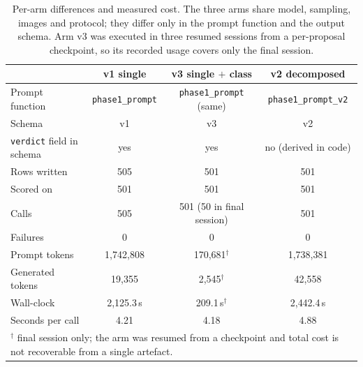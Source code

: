 \begin{table}[t]
\centering
\caption{Per-arm differences and measured cost. The three arms share model,
sampling, images and protocol; they differ only in the prompt function and the
output schema. Arm v3 was executed in three resumed sessions from a per-proposal
checkpoint, so its recorded usage covers only the final session.}
\label{tab:vlmarms}
\small
\begin{tabular}{lccc}
\toprule
 & v1 single & v3 single $+$ class & v2 decomposed \\
\midrule
Prompt function      & \texttt{phase1\_prompt} & \texttt{phase1\_prompt} (same) & \texttt{phase1\_prompt\_v2} \\
Schema               & v1 & v3 & v2 \\
\texttt{verdict} field in schema & yes & yes & no (derived in code) \\
Rows written         & 505 & 501 & 501 \\
Scored on            & 501 & 501 & 501 \\
Calls                & 505 & 501 (50 in final session) & 501 \\
Failures             & 0 & 0 & 0 \\
Prompt tokens        & 1{,}742{,}808 & 170{,}681$^\dagger$ & 1{,}738{,}381 \\
Generated tokens     & 19{,}355 & 2{,}545$^\dagger$ & 42{,}558 \\
Wall-clock           & 2{,}125.3\,s & 209.1\,s$^\dagger$ & 2{,}442.4\,s \\
Seconds per call     & 4.21 & 4.18 & 4.88 \\
\bottomrule
\multicolumn{4}{l}{\scriptsize $^\dagger$ final session only; the arm was resumed
from a checkpoint and total cost is not recoverable from a single artefact.} \\
\end{tabular}
\end{table}

